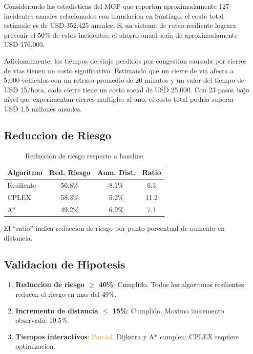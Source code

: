 \documentclass[conference]{IEEEtran}
\begin{document}
Considerando las estadisticas del MOP que reportan aproximadamente 127 incidentes anuales relacionados con inundacion en Santiago, el costo total estimado es de USD 352,425 anuales. Si un sistema de ruteo resiliente lograra prevenir el 50\% de estos incidentes, el ahorro anual seria de aproximadamente USD 176,000.

Adicionalmente, los tiempos de viaje perdidos por congestion causada por cierres de vias tienen un costo significativo. Estimando que un cierre de via afecta a 5,000 vehiculos con un retraso promedio de 20 minutos y un valor del tiempo de USD 15/hora, cada cierre tiene un costo social de USD 25,000. Con 23 pasos bajo nivel que experimentan cierres multiples al ano, el costo total podria superar USD 1.5 millones anuales.

\subsection{Reduccion de Riesgo}

\begin{table}[!t]
\centering
\caption{Reduccion de riesgo respecto a baseline}
\begin{tabular}{@{}lccc@{}}
\toprule
\textbf{Algoritmo} & \textbf{Red. Riesgo} & \textbf{Aum. Dist.} & \textbf{Ratio} \\
\midrule
Resiliente & 50.8\% & 8.1\% & 6.3 \\
CPLEX & 58.3\% & 5.2\% & 11.2 \\
A* & 49.2\% & 6.9\% & 7.1 \\
\bottomrule
\end{tabular}
\end{table}

El ``ratio'' indica reduccion de riesgo por punto porcentual de aumento en distancia.

\subsection{Validacion de Hipotesis}

\begin{enumerate}
    \item \textbf{Reduccion de riesgo $\geq$ 40\%}: \textcolor{green!60!black}{Cumplido}. Todos los algoritmos resilientes reducen el riesgo en mas del 49\%.

    \item \textbf{Incremento de distancia $\leq$ 15\%}: \textcolor{green!60!black}{Cumplido}. Maximo incremento observado: 10.5\%.

    \item \textbf{Tiempos interactivos}: \textcolor{orange}{Parcial}. Dijkstra y A* cumplen; CPLEX requiere optimizacion.
\end{enumerate}
\end{document}
